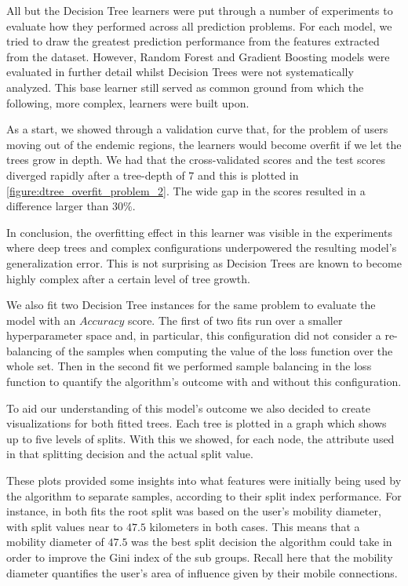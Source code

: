 All but the Decision Tree learners were put through a number of experiments to evaluate how they performed across all prediction problems.
For each model, we tried to draw the greatest prediction performance from the features extracted from the dataset.
However, Random Forest and Gradient Boosting models were evaluated in further detail whilst Decision Trees were not systematically analyzed. This base learner still served as common ground from which the following, more complex, learners were built upon.

As a start, we showed through a validation curve that, for the problem of users moving out of the endemic regions, the learners would become overfit if we let the trees grow in depth.
We had that the cross-validated scores and the test scores diverged rapidly after a tree-depth of $7$ and this is plotted in \cref{figure:dtree_overfit_problem_2}.
The wide gap in the scores resulted in a difference larger than $30\%$.

In conclusion, the overfitting effect in this learner was visible in the experiments where deep trees and complex configurations underpowered the resulting model's generalization error.
This is not surprising as Decision Trees are known to become highly complex after a certain level of tree growth.


We also fit two Decision Tree instances for the same problem to evaluate the model with an $Accuracy$ score.
The first of two fits run over a smaller hyperparameter space and, in particular, this configuration did not consider a re-balancing of the samples when computing the value of the loss function over the whole set.
Then in the second fit we performed sample balancing in the loss function to quantify the algorithm's outcome with and without this configuration.

To aid our understanding of this model's outcome we also decided to create visualizations for both fitted trees.
Each tree is plotted in a graph which shows up to five levels of splits.
With this we showed, for each node, the attribute used in that splitting decision and the actual split value.

These plots provided some insights into what features were initially being used by the algorithm to separate samples, according to their split index performance.
For instance, in both fits the root split was based on the user's mobility diameter, with split values near to $47.5$ kilometers in both cases.
This means that a mobility diameter of $47.5$ was the best split decision the algorithm could take in order to improve the Gini index of the sub groups.
Recall here that the mobility diameter quantifies the user's area of influence given by their mobile connections.

